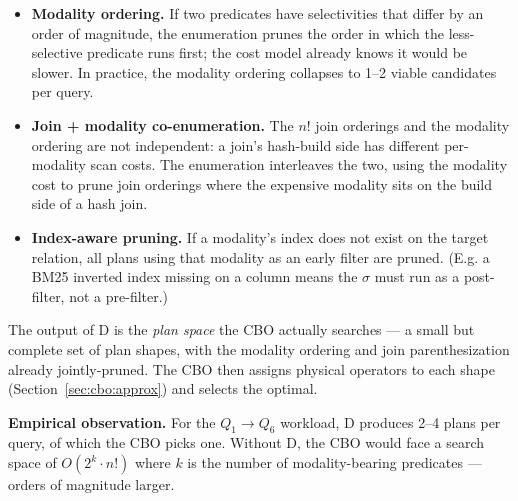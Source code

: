 \documentclass[sigconf,nonacm,review]{acmart}
\theoremstyle{plain}
\theoremstyle{definition}
\theoremstyle{remark}
\begin{document}
\begin{itemize}[leftmargin=*]
  \item \textbf{Modality ordering.} If two predicates have
    selectivities that differ by an order of magnitude, the
    enumeration prunes the order in which the less-selective
    predicate runs first; the cost model already knows it would
    be slower. In practice, the modality ordering collapses to
    1--2 viable candidates per query.
  \item \textbf{Join + modality co-enumeration.} The
    $n!$ join orderings and the modality ordering are not
    independent: a join's hash-build side has different
    per-modality scan costs. The enumeration interleaves the
    two, using the modality cost to prune join orderings where
    the expensive modality sits on the build side of a hash
    join.
  \item \textbf{Index-aware pruning.} If a modality's index
    does not exist on the target relation, all plans using that
    modality as an early filter are pruned. (E.g. a BM25
    inverted index missing on a column means the $\sigma$
    must run as a post-filter, not a pre-filter.)
\end{itemize}

The output of D is the \emph{plan space} the CBO actually
searches --- a small but complete set of plan shapes, with the
modality ordering and join parenthesization already
jointly-pruned. The CBO then assigns physical operators to
each shape (Section~\ref{sec:cbo:approx}) and selects the
optimal.

\noindent\textbf{Empirical observation.} For the $Q_1 \to Q_6$
workload, D produces 2--4 plans per query, of which the CBO
picks one. Without D, the CBO would face a search space of
$O(2^k \cdot n!)$ where $k$ is the number of modality-bearing
predicates --- orders of magnitude larger.
\end{document}
